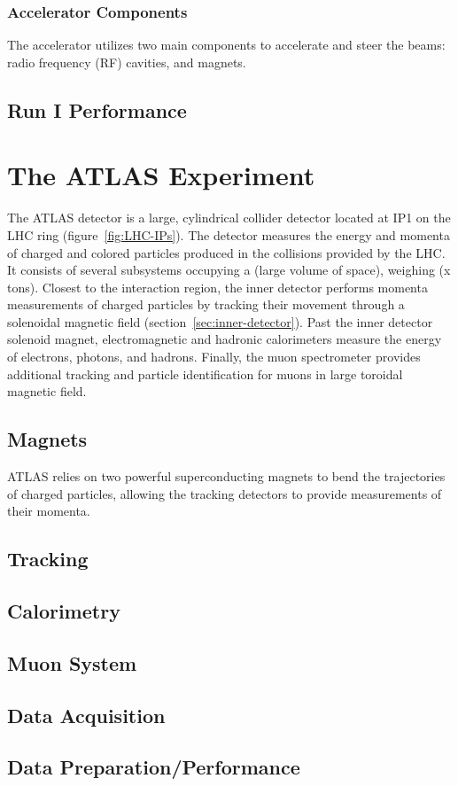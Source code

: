 \subsubsection{Accelerator Components}
The accelerator utilizes two main components to accelerate and steer the beams: radio frequency (RF) cavities, and magnets.



\subsection{Run I Performance}



\section{The ATLAS Experiment}
The ATLAS detector is a large, cylindrical collider detector located at IP1 on the LHC ring (figure~\ref{fig:LHC-IPs}). The detector measures the energy and momenta of charged and colored particles produced in the collisions provided by the LHC. It consists of several subsystems occupying a (large volume of space), weighing (x tons). Closest to the interaction region, the inner detector performs momenta measurements of charged particles by tracking their movement through a solenoidal magnetic field (section~\ref{sec:inner-detector}). Past the inner detector solenoid magnet, electromagnetic and hadronic calorimeters measure the energy of electrons, photons, and hadrons. Finally, the muon spectrometer provides additional tracking and particle identification for muons in large toroidal magnetic field. 




\subsection{Magnets}
ATLAS relies on two powerful superconducting magnets to bend the trajectories of charged particles, allowing the tracking detectors to provide measurements of their momenta. 




\subsection{Tracking}

\subsection{Calorimetry}

\subsection{Muon System}

\subsection{Data Acquisition}

\subsection{Data Preparation/Performance}


\printbibliography